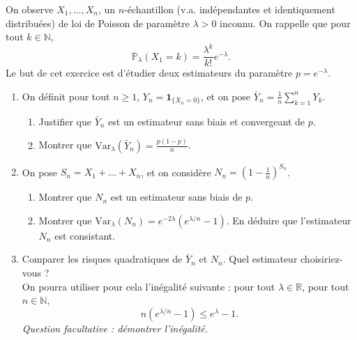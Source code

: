 \smallskip

\begin{mdframed}
\begin{exercice}
On observe $X_1, \dots, X_n$, un $n$-échantillon (v.a. indépendantes et identiquement distribuées) de loi de Poisson de paramètre $\lambda > 0$ inconnu. On rappelle que pour tout $k \in \mathbb{N}$,
\begin{equation*}
\mathbb{P}_\lambda(X_1 = k) = \frac{\lambda^k}{k!} e^{-\lambda}.
\end{equation*}
Le but de cet exercice est d'étudier deux estimateurs du paramètre $p = e^{-\lambda}$.

\begin{enumerate}
    \item On définit pour tout $n \ge 1$, $Y_n = \mathbf{1}_{\{X_n = 0\}}$, et on pose $\bar{Y}_n = \frac{1}{n}\sum_{k=1}^n Y_k$.
    \begin{enumerate}
        \item[i--] Justifier que $\bar{Y}_n$ est un estimateur sans biais et convergeant de $p$.
        \item[ii--] Montrer que $\text{Var}_\lambda(\bar{Y}_n) = \frac{p(1 - p)}{n}$.
    \end{enumerate}
    
    \item On pose $S_n = X_1 + \dots + X_n$, et on considère $N_n = \left( 1 - \frac{1}{n} \right)^{S_n}$.
    \begin{enumerate}
        \item[i--] Montrer que $N_n$ est un estimateur sans biais de $p$.
        \item[ii--] Montrer que $\text{Var}_\lambda(N_n) = e^{-2\lambda}\left( e^{\lambda/n} - 1 \right)$. En déduire que l'estimateur $N_n$ est consistant.
    \end{enumerate}
    
    \item Comparer les risques quadratiques de $\bar{Y}_n$ et $N_n$. Quel estimateur choisiriez-vous ?\\
    On pourra utiliser pour cela l'inégalité suivante : pour tout $\lambda \in \mathbb{R}$, pour tout $n \in \mathbb{N}$,
    \begin{equation}
    n(e^{\lambda/n} - 1) \le e^\lambda - 1.
    \end{equation}
    \textit{Question facultative : démontrer l'inégalité.}
    

\end{enumerate}
\end{exercice}
\end{mdframed}
